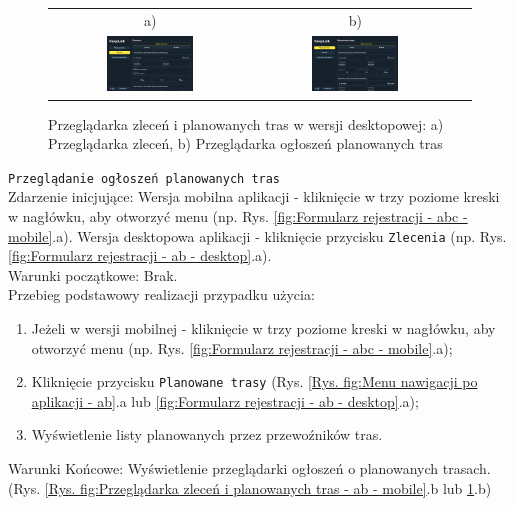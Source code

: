 \begin{figure}[H]
 \centering
  \begin{tabular}{@{}ccc@{}}
  a) & b)\\
  \includegraphics[width=0.45\textwidth]{rozdzial1/zlecenia_d.jpg} &
  \includegraphics[width=0.45\textwidth]{rozdzial1/planowane_trasy_d.jpg}
  \end{tabular}
 \caption{Przeglądarka zleceń i planowanych tras w wersji desktopowej: a) Przeglądarka zleceń, b) Przeglądarka ogłoszeń planowanych tras}
 \label{Rys. fig:Przeglądarka zleceń i planowanych tras - ab - desktop}
\end{figure}

\label{Przeglądanie ogłoszeń planowanych tras}
\texttt{Przeglądanie ogłoszeń planowanych tras} \\
Zdarzenie inicjujące: Wersja mobilna aplikacji - kliknięcie w trzy poziome kreski w nagłówku, aby otworzyć menu (np. Rys. \ref{fig:Formularz rejestracji - abc - mobile}.a). Wersja desktopowa aplikacji - kliknięcie przycisku \texttt{Zlecenia} (np. Rys. \ref{fig:Formularz rejestracji - ab - desktop}.a). \\
Warunki początkowe: Brak. \\
Przebieg podstawowy realizacji przypadku użycia:
\begin{enumerate}
    \item Jeżeli w wersji mobilnej - kliknięcie w trzy poziome kreski w nagłówku, aby otworzyć menu (np. Rys. \ref{fig:Formularz rejestracji - abc - mobile}.a);
    \item Kliknięcie przycisku \texttt{Planowane trasy} (Rys. \ref{Rys. fig:Menu nawigacji po aplikacji - ab}.a lub \ref{fig:Formularz rejestracji - ab - desktop}.a);
    \item Wyświetlenie listy planowanych przez przewoźników tras.
\end{enumerate}
Warunki Końcowe: Wyświetlenie przeglądarki ogłoszeń o planowanych trasach. (Rys. \ref{Rys. fig:Przeglądarka zleceń i planowanych tras - ab - mobile}.b lub \ref{Rys. fig:Przeglądarka zleceń i planowanych tras - ab - desktop}.b)\\

